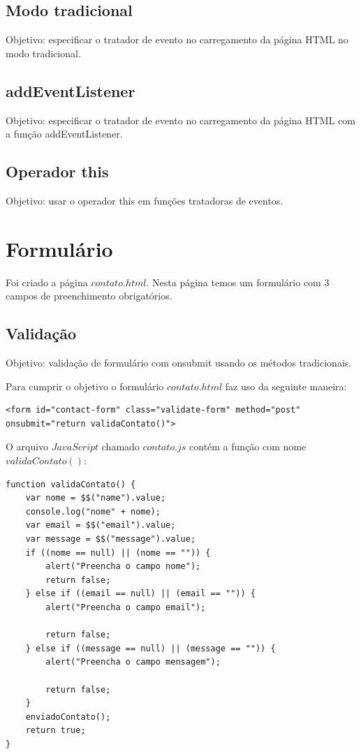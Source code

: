 \subsection{Modo tradicional}
Objetivo: especificar o tratador de evento no carregamento da página HTML no modo tradicional.


\subsection{addEventListener}
 Objetivo: especificar o tratador de evento no carregamento da página HTML com a função addEventListener.
 
\subsection{Operador this}
 Objetivo: usar o operador this em funções tratadoras de eventos.
 
 


\section{Formulário}
	Foi criado a página $contato.html$. Nesta página temos um formulário com $3$ campos de preenchimento obrigatórios.
	
\subsection{Validação}
	Objetivo: validação de formulário com onsubmit usando os métodos tradicionais.
	
	Para cumprir o objetivo o formulário $contato.html$ faz uso da seguinte maneira:
\begin{lstlisting}
<form id="contact-form" class="validate-form" method="post" onsubmit="return validaContato()">
\end{lstlisting}

	O arquivo $JavaScript$ chamado $contato.js$ contém a função com nome $validaContato()$:
\begin{lstlisting}
function validaContato() {
    var nome = $$("name").value;
    console.log("nome" + nome);
    var email = $$("email").value;
    var message = $$("message").value;
    if ((nome == null) || (nome == "")) {
        alert("Preencha o campo nome");
        return false;
    } else if ((email == null) || (email == "")) {
        alert("Preencha o campo email");

        return false;
    } else if ((message == null) || (message == "")) {
        alert("Preencha o campo mensagem");

        return false;
    }
    enviadoContato();
    return true;
}
\end{lstlisting}
	

